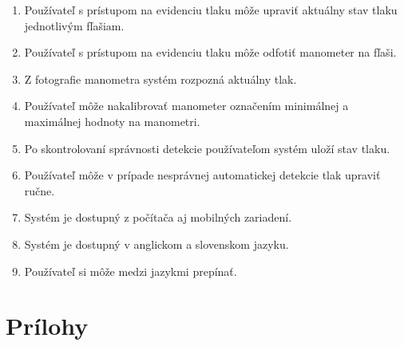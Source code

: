 \documentclass[hreffootnote]{zah}
\begin{document}
\begin{enumerate}
\item Používateľ s prístupom na evidenciu tlaku môže upraviť aktuálny stav tlaku jednotlivým fľašiam.
\item Používateľ s prístupom na evidenciu tlaku môže odfotiť manometer na fľaši.
\item Z fotografie manometra systém rozpozná aktuálny tlak.
\item Používateľ môže nakalibrovať manometer označením minimálnej a maximálnej hodnoty na manometri.
\item Po skontrolovaní správnosti detekcie používateľom systém uloží stav tlaku.
\item Používateľ môže v prípade nesprávnej automatickej detekcie tlak upraviť ručne.

\item Systém je dostupný z počítača aj mobilných zariadení.
\item Systém je dostupný v anglickom a slovenskom jazyku.
\item Používateľ si môže medzi jazykmi prepínať.
\end{enumerate}

\label{reqs}

\cleardoublepage
\section{Prílohy}
\end{document}
